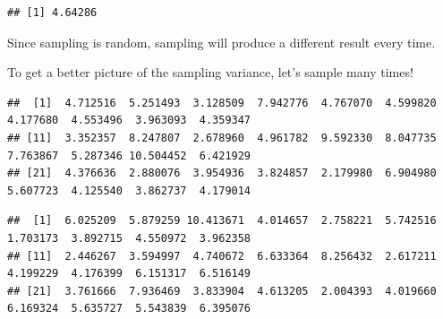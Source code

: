 \documentclass[
]{article}
\newenvironment{Shaded}{\begin{snugshade}}{\end{snugshade}}
\newcommand{\CommentTok}[1]{\textcolor[rgb]{0.56,0.35,0.01}{\textit{#1}}}
\newcommand{\ControlFlowTok}[1]{\textcolor[rgb]{0.13,0.29,0.53}{\textbf{#1}}}
\newcommand{\DecValTok}[1]{\textcolor[rgb]{0.00,0.00,0.81}{#1}}
\newcommand{\FunctionTok}[1]{\textcolor[rgb]{0.00,0.00,0.00}{#1}}
\newcommand{\NormalTok}[1]{#1}
\newcommand{\OtherTok}[1]{\textcolor[rgb]{0.56,0.35,0.01}{#1}}
\newcommand{\SpecialCharTok}[1]{\textcolor[rgb]{0.00,0.00,0.00}{#1}}
\newcommand{\StringTok}[1]{\textcolor[rgb]{0.31,0.60,0.02}{#1}}
\begin{document}
\begin{verbatim}
## [1] 4.64286
\end{verbatim}

Since sampling is random, sampling will produce a different result every
time.

To get a better picture of the sampling variance, let's sample many
times!

\begin{Shaded}
\end{Shaded}

\begin{verbatim}
##  [1]  4.712516  5.251493  3.128509  7.942776  4.767070  4.599820  4.177680  4.553496  3.963093  4.359347
## [11]  3.352357  8.247807  2.678960  4.961782  9.592330  8.047735  7.763867  5.287346 10.504452  6.421929
## [21]  4.376636  2.880076  3.954936  3.824857  2.179980  6.904980  5.607723  4.125540  3.862737  4.179014
\end{verbatim}

\begin{Shaded}
\end{Shaded}

\begin{verbatim}
##  [1]  6.025209  5.879259 10.413671  4.014657  2.758221  5.742516  1.703173  3.892715  4.550972  3.962358
## [11]  2.446267  3.594997  4.740672  6.633364  8.256432  2.617211  4.199229  4.176399  6.151317  6.516149
## [21]  3.761666  7.936469  3.833904  4.613205  2.004393  4.019660  6.169324  5.635727  5.543839  6.395076
\end{verbatim}

\begin{Shaded}
\end{Shaded}
\end{document}
